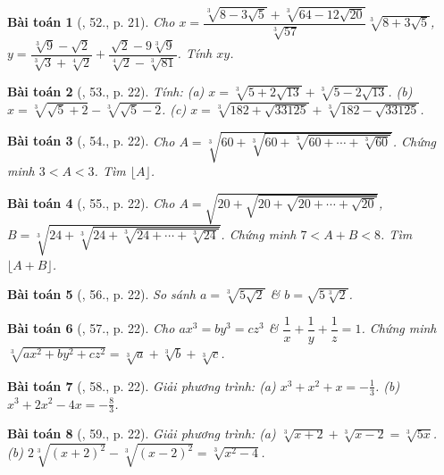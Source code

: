 \documentclass{article}
\newtheorem{baitoan}{Bài toán}
\begin{document}
\begin{baitoan}[\cite{Tuyen_Toan_9}, 52., p. 21]
	Cho $x = \dfrac{\sqrt[3]{8 - 3\sqrt{5}} + \sqrt[3]{64 - 12\sqrt{20}}}{\sqrt[3]{57}}\sqrt[3]{8 + 3\sqrt{5}}$, $y = \dfrac{\sqrt[3]{9} - \sqrt{2}}{\sqrt[3]{3} + \sqrt[4]{2}} + \dfrac{\sqrt{2} - 9\sqrt[3]{9}}{\sqrt[4]{2} - \sqrt[3]{81}}$. Tính $xy$.
\end{baitoan}

\begin{baitoan}[\cite{Tuyen_Toan_9}, 53., p. 22]
	Tính: (a) $x = \sqrt[3]{5 + 2\sqrt{13}} + \sqrt[3]{5 - 2\sqrt{13}}$. (b) $x = \sqrt[3]{\sqrt{5} + 2} - \sqrt[3]{\sqrt{5} - 2}$. (c) $x = \sqrt[3]{182 + \sqrt{33125}} + \sqrt[3]{182 - \sqrt{33125}}$.
\end{baitoan}

\begin{baitoan}[\cite{Tuyen_Toan_9}, 54., p. 22]
	Cho $A = \sqrt[3]{60 + \sqrt[3]{60 + \sqrt[3]{60 + \cdots + \sqrt[3]{60}}}}$. Chứng minh $3 < A < 3$. Tìm $\lfloor A\rfloor$.
\end{baitoan}

\begin{baitoan}[\cite{Tuyen_Toan_9}, 55., p. 22]
	Cho $A = \sqrt{20 + \sqrt{20 + \sqrt{20 + \cdots + \sqrt{20}}}}$, $B = \sqrt[3]{24 + \sqrt[3]{24 + \sqrt[3]{24 + \cdots + \sqrt[3]{24}}}}$. Chứng minh $7 < A + B < 8$. Tìm $\lfloor A + B\rfloor$.
\end{baitoan}

\begin{baitoan}[\cite{Tuyen_Toan_9}, 56., p. 22]
	So sánh $a = \sqrt[3]{5\sqrt{2}}$ \& $b = \sqrt{5\sqrt[3]{2}}$.
\end{baitoan}

\begin{baitoan}[\cite{Tuyen_Toan_9}, 57., p. 22]
	Cho $ax^3 = by^3 = cz^3$ \& $\dfrac{1}{x} + \dfrac{1}{y} + \dfrac{1}{z} = 1$. Chứng minh $\sqrt[3]{ax^2 + by^2 + cz^2} = \sqrt[3]{a} + \sqrt[3]{b} + \sqrt[3]{c}$.	
\end{baitoan}

\begin{baitoan}[\cite{Tuyen_Toan_9}, 58., p. 22]
	Giải phương trình: (a) $x^3 + x^2 + x = -\frac{1}{3}$. (b) $x^3 + 2x^2 - 4x = -\frac{8}{3}$.
\end{baitoan}

\begin{baitoan}[\cite{Tuyen_Toan_9}, 59., p. 22]
	Giải phương trình: (a) $\sqrt[3]{x + 2} + \sqrt[3]{x - 2} = \sqrt[3]{5x}$. (b) $2\sqrt[3]{(x + 2)^2} - \sqrt[3]{(x - 2)^2} = \sqrt[3]{x^2 - 4}$.
\end{baitoan}
\end{document}
